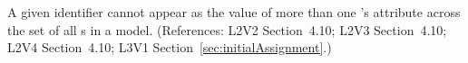 A given identifier cannot appear as the value of more than one
\InitialAssignment{}'s  attribute across
the set of all \InitialAssignment{}s in a model.  (References:
L2V2 Section~4.10; L2V3
Section~4.10; L2V4 Section~4.10; L3V1 Section~\ref{sec:initialAssignment}.)
